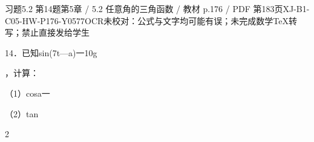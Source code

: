 \begin{bankitem}{习题5.2 第14题}{第5章 / 5.2 任意角的三角函数 / 教材 p.176 / PDF 第183页}{XJ-B1-C05-HW-P176-Y0577}{OCR未校对：公式与文字均可能有误；未完成数学TeX转写；禁止直接发给学生}
\begin{ocrdraft}
\par
14．已知sin(7t—a)一10g
\par
，计算：
\par
（1）cosa一
\par
（2）tan
\par
2
\end{ocrdraft}
\end{bankitem}
